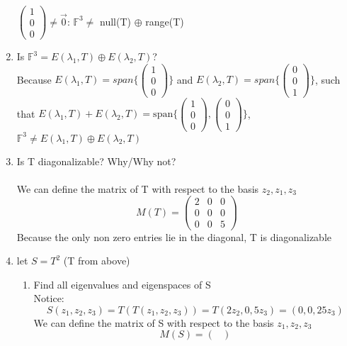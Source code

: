\documentclass[12pt]{article}
\begin{document}
\begin{enumerate}[label = (\alph*)]
		$
		\begin{pmatrix}
			1 \\
			0 \\
			0
		\end{pmatrix} \not = \vec{0}
		$: \qquad 
		$\mathbb{F}^3 \not =$ null(T) $\oplus$ range(T)
		\item Is $\mathbb{F}^3 = E(\lambda_1,T) \oplus E(\lambda_2,T)$? \\
		Because $E(\lambda_1,T) = 
		span\{
		\begin{pmatrix}
			1 \\
			0 \\
			0
		\end{pmatrix} 
		\}
		$ and $E(\lambda_2,T) = span \{
		\begin{pmatrix}
		0 \\
		0 \\
		1
		\end{pmatrix} 
		\}
		$, such that $E(\lambda_1,T) + E(\lambda_2,T) = \text{span} \{ 
		\begin{pmatrix}
		1 \\
		0 \\
		0
		\end{pmatrix},
		\begin{pmatrix}
		0 \\
		0 \\
		1
		\end{pmatrix} \}$,
		 $\mathbb{F}^3 \not = E(\lambda_1,T) \oplus E(\lambda_2,T)$
		 \item Is T diagonalizable? Why/Why not? \\ \\
		We can define the matrix of T with respect to the basis $z_2, z_1, z_3$
		$$
		M(T) = 
		\begin{pmatrix}
		2 & 0 & 0 \\
		0 & 0 & 0 \\
		0 & 0 & 5
		\end{pmatrix}
		$$ 
		Because the only non zero entries lie in the diagonal, T is diagonalizable
		\newpage 
		\item let $S = T^2$ (T from above)
			\begin{enumerate}[label = (\roman*)]
				\item Find all eigenvalues and eigenspaces of S
				\\
				Notice:
				$$
				S(z_1,z_2,z_3) = T(T(z_1,z_2,z_3)) = T(2z_2,0,5z_3) = (0,0,25z_3)
				$$
				We can define the matrix of S with respect to the basis $z_1, z_2, z_3$
				$$ 
				M(S) = 
				\begin{pmatrix}

\end{pmatrix}$$
\end{enumerate}
\end{enumerate}
\end{document}
